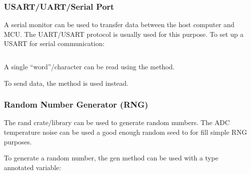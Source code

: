\documentclass{beamer}
\begin{document}
\begin{frame}[allowframebreaks]
  \frametitle{USART/UART/Serial Port}
  A serial monitor can be used to transfer data between the host computer and MCU. The UART/USART protocol is usually used for this purpose. To set up a USART for serial communication:
  \begin{columns}[t]
    \begin{column}{.5\linewidth}
      
    \end{column}
    \begin{column}{.5\linewidth}
      
    \end{column}
  \end{columns}
  \begin{columns}[t]
    \begin{column}{.5\linewidth}
      
    \end{column}
    \begin{column}{.5\linewidth}
      
    \end{column}
  \end{columns}

  A single ``word''/character can be read using the  method.
  

  \pagebreak

  To send data, the  method is used instead.
  
  
\end{frame}

\begin{frame}
  \frametitle{Random Number Generator (RNG)}
  The rand crate/library can be used to generate random numbers. The ADC temperature noise can be used a good enough random seed to for fill simple RNG purposes.
  

  To generate a random number, the gen method can be used with a type annotated variable:
  
\end{frame}
\end{document}
